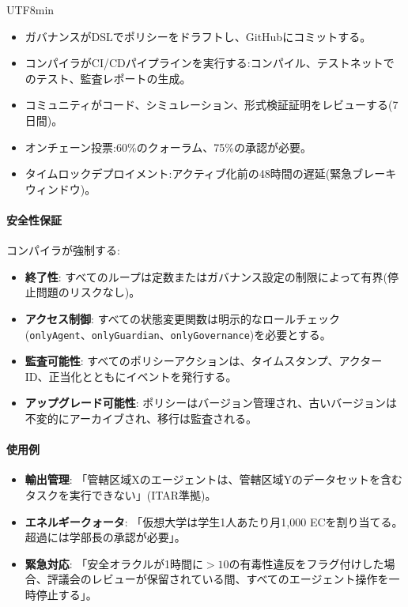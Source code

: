 \documentclass[11pt]{article}
\begin{document}
\begin{CJK}{UTF8}{min}
\begin{enumerate}[noitemsep]
    \begin{itemize}[noitemsep]
      \item ガバナンスがDSLでポリシーをドラフトし、GitHubにコミットする。
      \item コンパイラがCI/CDパイプラインを実行する:コンパイル、テストネットでのテスト、監査レポートの生成。
      \item コミュニティがコード、シミュレーション、形式検証証明をレビューする(7日間)。
      \item オンチェーン投票:60\%のクォーラム、75\%の承認が必要。
      \item タイムロックデプロイメント:アクティブ化前の48時間の遅延(緊急ブレーキウィンドウ)。
    \end{itemize}
\end{enumerate}

\paragraph{安全性保証} コンパイラが強制する:
\begin{itemize}[noitemsep]
  \item \textbf{終了性}: すべてのループは定数またはガバナンス設定の制限によって有界(停止問題のリスクなし)。
  \item \textbf{アクセス制御}: すべての状態変更関数は明示的なロールチェック(\texttt{onlyAgent}、\texttt{onlyGuardian}、\texttt{onlyGovernance})を必要とする。
  \item \textbf{監査可能性}: すべてのポリシーアクションは、タイムスタンプ、アクターID、正当化とともにイベントを発行する。
  \item \textbf{アップグレード可能性}: ポリシーはバージョン管理され、古いバージョンは不変的にアーカイブされ、移行は監査される。
\end{itemize}

\paragraph{使用例}
\begin{itemize}[noitemsep]
  \item \textbf{輸出管理}: 「管轄区域Xのエージェントは、管轄区域Yのデータセットを含むタスクを実行できない」(ITAR準拠)。
  \item \textbf{エネルギークォータ}: 「仮想大学は学生1人あたり月1,000 ECを割り当てる。超過には学部長の承認が必要」。
  \item \textbf{緊急対応}: 「安全オラクルが1時間に$>10$の有毒性違反をフラグ付けした場合、評議会のレビューが保留されている間、すべてのエージェント操作を一時停止する」。
\end{itemize}


\end{CJK}
\end{document}
